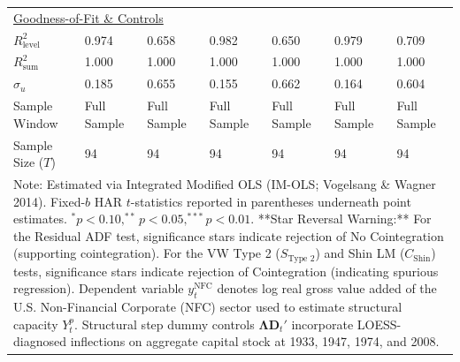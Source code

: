 \begin{landscape}
\begin{table}[H]
\begin{tabular}{p{5.2cm}p{1.8cm}p{1.8cm}p{1.8cm}p{1.8cm}p{1.8cm}p{1.8cm}}
\midrule
\multicolumn{7}{l}{\underline{Goodness-of-Fit \& Controls}} \\
$R_{\text{level}}^2$ & 0.974 & 0.658 & 0.982 & 0.650 & 0.979 & 0.709  \\
$R_{\text{sum}}^2$ & 1.000 & 1.000 & 1.000 & 1.000 & 1.000 & 1.000  \\
$\hat{\sigma}_u$ & 0.185 & 0.655 & 0.155 & 0.662 & 0.164 & 0.604  \\
Sample Window & Full Sample & Full Sample & Full Sample & Full Sample & Full Sample & Full Sample  \\
Sample Size ($T$) & 94 & 94 & 94 & 94 & 94 & 94  \\
\bottomrule
\multicolumn{7}{p{19.5cm}}{\footnotesize Note: Estimated via Integrated Modified OLS (IM-OLS; Vogelsang \& Wagner 2014). Fixed-$b$ HAR $t$-statistics reported in parentheses underneath point estimates. $^*p<0.10, ^{**}p<0.05, ^{***}p<0.01$. **Star Reversal Warning:** For the Residual ADF test, significance stars indicate rejection of No Cointegration (supporting cointegration). For the VW Type 2 ($S_{\text{Type 2}}$) and Shin LM ($C_{\text{Shin}}$) tests, significance stars indicate rejection of Cointegration (indicating spurious regression). Dependent variable $y_t^{\text{NFC}}$ denotes log real gross value added of the U.S. Non-Financial Corporate (NFC) sector used to estimate structural capacity $Y_t^p$. Structural step dummy controls $\boldsymbol{\Lambda} \mathbf{D}_t'$ incorporate LOESS-diagnosed inflections on aggregate capital stock at 1933, 1947, 1974, and 2008.}
\end{tabular}
\end{table}
\end{landscape}
